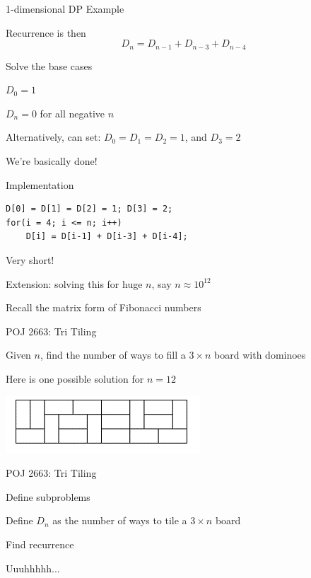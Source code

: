 \documentclass[13pt,onlymath]{beamer}
\begin{document}
\begin{frame}{1-dimensional DP Example}
\BIT
\item Recurrence is then
\[
D_n = D_{n-1} + D_{n-3} + D_{n-4}
\]
\item Solve the base cases
\BIT
\item $D_0 = 1$
\item $D_n = 0$ for all negative $n$
\item Alternatively, can set: $D_0 = D_1 = D_2 = 1$, and $D_3 = 2$
\EIT
\vfill
\item We're basically done!
\EIT
\end{frame}

\begin{frame}[fragile]{Implementation}
\begin{Verbatim}[xleftmargin=25pt]
D[0] = D[1] = D[2] = 1; D[3] = 2;
for(i = 4; i <= n; i++)
    D[i] = D[i-1] + D[i-3] + D[i-4];
\end{Verbatim}
\BIT
\item Very short!
\item Extension: solving this for huge $n$, say $n \approx 10^{12}$
\BIT
\item Recall the matrix form of Fibonacci numbers
\EIT
\EIT
\end{frame}

\begin{frame}{POJ 2663: Tri Tiling}
\BIT
\item Given $n$, find the number of ways to fill a $3 \times n$ board with dominoes
\vfill
\item Here is one possible solution for $n=12$
\begin{center}
\includegraphics[height=0.3\textheight]{figures/tritiling}
\end{center}
\EIT
\end{frame}

\begin{frame}{POJ 2663: Tri Tiling}
\BIT
\item Define subproblems
\BIT
\item Define $D_n$ as the number of ways to tile a $3 \times n$ board
\EIT
\vfill
\item Find recurrence
\BIT
\item Uuuhhhhh...
\EIT
\EIT
\end{frame}
\end{document}
